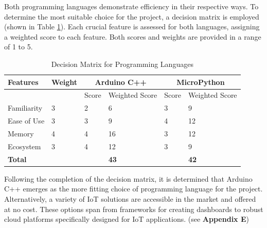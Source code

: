 \noindent Both programming languages demonstrate efficiency in their respective ways.  To determine the most suitable choice for the project, a decision matrix is employed (shown in Table \ref{fig:decision-matrix}). Each crucial feature is assessed for both languages, assigning a weighted score to each feature. Both scores and weights are provided in a range of 1 to 5.


\begin{table}[!h]
\centering
\begin{tabularx}{\textwidth}{|X|X|X|X|X|X|}
    \hline
    \textbf{Features} 
    & \textbf{Weight}
    & \multicolumn{2}{c|}{\textbf{Arduino C++}}
    &  \multicolumn{2}{c|}{\textbf{MicroPython}}  \\ \hline

    &
    & Score 
    & Weighted Score
    & Score 
    & Weighted Score \\ \hline

    Familiarity 
    & 3 
    & 2 
    & 6
    & 3
    & 9 \\ \hline
    
    Ease of Use
    & 3 
    & 3 
    & 9
    & 4 
    & 12 \\ \hline
    
    Memory 
    & 4 
    & 4 
    & 16
    & 3 
    & 12 \\ \hline
    
    Ecosystem 
    & 3 
    & 4 
    & 12
    & 3 
    & 9 \\ \hline
    
    \textbf{Total} 
    & 
    &
    & \textbf{43} 
    &  
    & \textbf{42}  \\ \hline
    
\end{tabularx}
\caption{Decision Matrix for Programming Languages}
\label{fig:decision-matrix}
\end{table}

\noindent Following the completion of the decision matrix, it is determined that Arduino C++ emerges as the more fitting choice of programming language for the project. \\

Alternatively, a variety of IoT solutions are accessible in the market and offered at no cost. These options span from frameworks for creating dashboards to robust cloud platforms specifically designed for IoT applications. (see \textbf{Appendix E})\\

